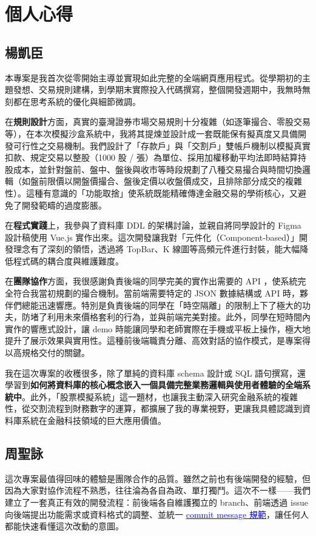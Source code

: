 \documentclass[UTF8, a4paper, 12pt, fontset=none]{ctexart}
\let\oldhref\href
\renewcommand{\href}[2]{\oldhref{#1}{\textcolor{blue}{\uline{#2}}}}
\begin{document}
\section{個人心得}
\subsection*{楊凱臣}
本專案是我首次從零開始主導並實現如此完整的全端網頁應用程式。從學期初的主題發想、交易規則建構，到學期末實際投入代碼撰寫，整個開發週期中，我無時無刻都在思考系統的優化與細節微調。

在\textbf{規則設計}方面，真實的臺灣證券市場交易規則十分複雜（如逐筆撮合、零股交易等），在本次模擬沙盒系統中，我將其提煉並設計成一套既能保有擬真度又具備開發可行性之交易機制。我們設計了「存款戶」與「交割戶」雙帳戶機制以模擬真實扣款、規定交易以整股（1000 股 / 張）為單位、採用加權移動平均法即時結算持股成本，並針對盤前、盤中、盤後與收市等時段規劃了八種交易撮合與時間切換邏輯（如盤前限價以開盤價撮合、盤後定價以收盤價成交，且排除部分成交的複雜性）。這種有意識的「功能取捨」使系統既能精確傳達金融交易的學術核心，又避免了開發範疇的過度膨脹。

在\textbf{程式實踐}上，我參與了資料庫 DDL 的架構討論，並親自將同學設計的 Figma 設計稿使用 Vue.js 實作出來。這次開發讓我對「元件化（Component-based）」開發理念有了深刻的領悟，透過將 TopBar、K 線圖等高頻元件進行封裝，能大幅降低程式碼的耦合度與維護難度。

在\textbf{團隊協作}方面，我很感謝負責後端的同學完美的實作出需要的 API ，使系統完全符合我當初規劃的撮合機制。當前端需要特定的 JSON 數據結構或 API 時，夥伴們總能迅速響應。特別是負責後端的同學在「時空隔離」的限制上下了極大的功夫，防堵了利用未來價格套利的行為，並與前端完美對接。此外，同學在短時間內實作的響應式設計，讓 demo 時能讓同學和老師實際在手機或平板上操作，極大地提升了展示效果與實用性。這種前後端職責分離、高效對話的協作模式，是專案得以高規格交付的關鍵。

我在這次專案的收穫很多，除了單純的資料庫 schema 設計或 SQL 語句撰寫，還學習到\textbf{如何將資料庫的核心概念嵌入一個具備完整業務邏輯與使用者體驗的全端系統中}。此外，「股票模擬系統」這一題材，也讓我主動深入研究金融系統的複雜性，從交割流程到財務數字的運算，都擴展了我的專業視野，更讓我具體認識到資料庫系統在金融科技領域的巨大應用價值。

\subsection*{周聖詠}
這次專案最值得回味的體驗是團隊合作的品質。雖然之前也有後端開發的經驗，但因為大家對協作流程不熟悉，往往淪為各自為政、單打獨鬥。這次不一樣——我們建立了一套真正有效的開發流程：前後端各自維護獨立的 branch、前端透過 issue 向後端提出功能需求或資料格式的調整、並統一 \href{https://ithelp.ithome.com.tw/articles/10228738}{commit message 規範}，讓任何人都能快速看懂這次改動的意圖。
\end{document}
